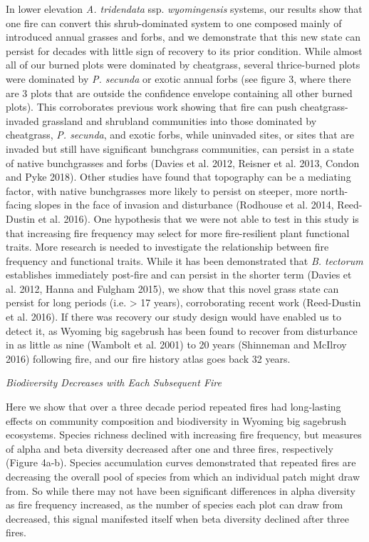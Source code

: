 \documentclass[12pt,]{article}
\begin{document}
In lower elevation \emph{A. tridendata} ssp. \emph{wyomingensis}
systems, our results show that one fire can convert this shrub-dominated
system to one composed mainly of introduced annual grasses and forbs,
and we demonstrate that this new state can persist for decades with
little sign of recovery to its prior condition. While almost all of our
burned plots were dominated by cheatgrass, several thrice-burned plots
were dominated by \emph{P. secunda} or exotic annual forbs (see figure
3, where there are 3 plots that are outside the confidence envelope
containing all other burned plots). This corroborates previous work
showing that fire can push cheatgrass-invaded grassland and shrubland
communities into those dominated by cheatgrass, \emph{P. secunda}, and
exotic forbs, while uninvaded sites, or sites that are invaded but still
have significant bunchgrass communities, can persist in a state of
native bunchgrasses and forbs (Davies et al. 2012, Reisner et al. 2013,
Condon and Pyke 2018). Other studies have found that topography can be a
mediating factor, with native bunchgrasses more likely to persist on
steeper, more north-facing slopes in the face of invasion and
disturbance (Rodhouse et al. 2014, Reed-Dustin et al. 2016). One
hypothesis that we were not able to test in this study is that
increasing fire frequency may select for more fire-resilient plant
functional traits. More research is needed to investigate the
relationship between fire frequency and functional traits. While it has
been demonstrated that \emph{B. tectorum} establishes immediately
post-fire and can persist in the shorter term (Davies et al. 2012, Hanna
and Fulgham 2015), we show that this novel grass state can persist for
long periods (i.e. \textgreater{} 17 years), corroborating recent work
(Reed-Dustin et al. 2016). If there was recovery our study design would
have enabled us to detect it, as Wyoming big sagebrush has been found to
recover from disturbance in as little as nine (Wambolt et al. 2001) to
20 years (Shinneman and McIlroy 2016) following fire, and our fire
history atlas goes back 32 years.

\emph{Biodiversity Decreases with Each Subsequent Fire}

Here we show that over a three decade period repeated fires had
long-lasting effects on community composition and biodiversity in
Wyoming big sagebrush ecosystems. Species richness declined with
increasing fire frequency, but measures of alpha and beta diversity
decreased after one and three fires, respectively (Figure 4a-b). Species
accumulation curves demonstrated that repeated fires are decreasing the
overall pool of species from which an individual patch might draw from.
So while there may not have been significant differences in alpha
diversity as fire frequency increased, as the number of species each
plot can draw from decreased, this signal manifested itself when beta
diversity declined after three fires.
\end{document}

